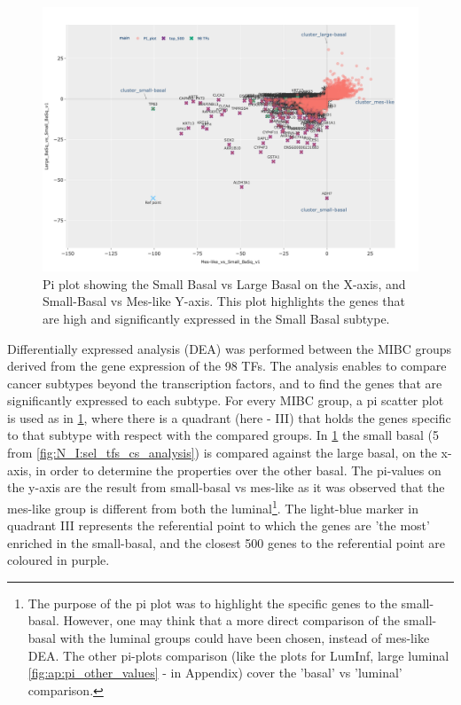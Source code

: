 \begin{figure}[!htb]   
\centering
\includegraphics[width=1.0\textwidth,height=1.0\textheight,keepaspectratio]{Sections/Network_I/Resources/selective_pruning/pi_gsea/pi_smallBasal.png}
  \caption{Pi plot showing the Small Basal vs Large Basal on the X-axis, and Small-Basal vs Mes-like Y-axis. This plot highlights the genes that are high and significantly expressed in the Small Basal subtype. }
\label{fig:N_I:pi_smallBasal_comp}
\end{figure}

Differentially expressed analysis (DEA) was performed between the MIBC groups derived from the gene expression of the 98 TFs. The analysis enables to compare cancer subtypes beyond the transcription factors, and to find the genes that are significantly expressed to each subtype. For every MIBC group, a pi scatter plot is used as in \cref{fig:N_I:pi_smallBasal_comp}, where there is a quadrant (here - III) that holds the genes specific to that subtype with respect with the compared groups. In \cref{fig:N_I:pi_smallBasal_comp} the small basal (5 from \cref{fig:N_I:sel_tfs_cs_analysis}) is compared against the large basal, on the x-axis, in order to determine the properties over the other basal. The pi-values on the y-axis are the result from small-basal vs mes-like as it was observed that the mes-like group is different from both the luminal\footnote{The purpose of the pi plot was to highlight the specific genes to the small-basal. However, one may think that a more direct comparison of the small-basal with the luminal groups could have been chosen, instead of mes-like DEA. The other pi-plots comparison (like the plots for LumInf,  large luminal \cref{fig:ap:pi_other_values} - in Appendix) cover the 'basal' vs 'luminal' comparison. }. The light-blue marker in quadrant III represents the referential point to which the genes are 'the most' enriched in the small-basal, and the closest 500 genes to the referential point are coloured in purple. 


